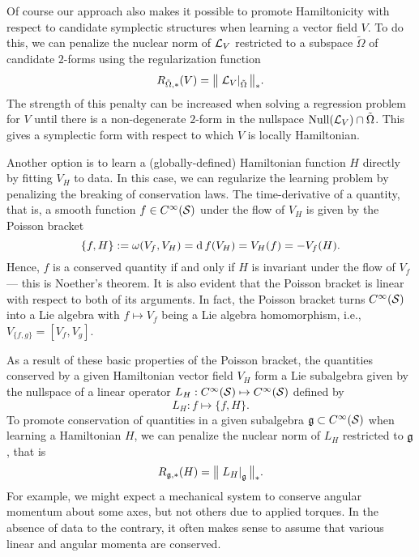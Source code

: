 \documentclass[twoside,11pt]{article}
\begin{document}
Of course our approach also makes it possible to promote Hamiltonicity with respect to candidate symplectic structures when learning a vector field $V$.
To do this, we can penalize the nuclear norm of ${\mathcal{L}}_V$ restricted to a subspace $\tilde{\Omega}$ of candidate $2$-forms using the regularization function
\begin{equation}
    R_{\tilde{\Omega},*}(V) = \big\Vert \left. {\mathcal{L}}_V \right\vert_{\tilde{\Omega}} \big\Vert_*.
\end{equation}
The strength of this penalty can be increased when solving a regression problem for $V$ until there is a non-degenerate $2$-form in the nullspace $\operatorname{Null}({\mathcal{L}}_V) \cap \tilde{\Omega}$.
This gives a symplectic form with respect to which $V$ is locally Hamiltonian.

Another option is to learn a (globally-defined) Hamiltonian function $H$ directly by fitting $V_H$ to data.
In this case, we can regularize the learning problem by penalizing the breaking of conservation laws.
The time-derivative of a quantity, that is, a smooth function $f\in C^{\infty}({\mathcal{S}})$ under the flow of $V_H$ is given by the Poisson bracket
\begin{equation}
    \{ f, H \} := \omega(V_f, V_H) = \operatorname{\mathrm{d}} f(V_H) = V_H(f) = -V_f(H).
\end{equation}
Hence, $f$ is a conserved quantity if and only if $H$ is invariant under the flow of $V_f$ --- this is Noether's theorem.
It is also evident that the Poisson bracket is linear with respect to both of its arguments.
In fact, the Poisson bracket turns $C^{\infty}({\mathcal{S}})$ into a Lie algebra with $f \mapsto V_f$ being a Lie algebra homomorphism, i.e.,
$
    V_{\{f, g \}} = [V_f, V_g]
$.

As a result of these basic properties of the Poisson bracket, the quantities conserved by a given Hamiltonian vector field $V_H$ form a Lie subalgebra given by the nullspace of a linear operator $L_H : C^{\infty}({\mathcal{S}}) \mapsto C^{\infty}({\mathcal{S}})$ defined by
\begin{equation}
    L_H : f \mapsto \{ f, H \}.
\end{equation}
To promote conservation of quantities in a given subalgebra ${\mathfrak{g}} \subset C^{\infty}({\mathcal{S}})$ when learning a Hamiltonian $H$, we can penalize the nuclear norm of $L_H$ restricted to ${\mathfrak{g}}$, that is
\begin{equation}
    R_{{\mathfrak{g}},*}(H) = \big\Vert \left.L_H\right\vert_{{\mathfrak{g}}} \big\Vert_*.
\end{equation}
For example, we might expect a mechanical system to conserve angular momentum about some axes, but not others due to applied torques.
In the absence of data to the contrary, it often makes sense to assume that various linear and angular momenta are conserved.
\end{document}
